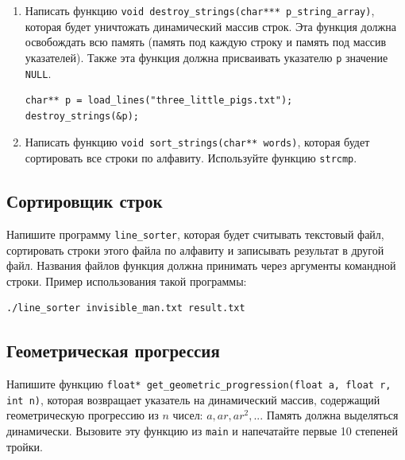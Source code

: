 \documentclass{article}
\begin{document}
\begin{enumerate}
\item Написать функцию \texttt{void destroy\_strings(char*** p\_string\_array)}, которая будет уничтожать динамический массив строк. Эта функция должна освобождать всю память (память под каждую строку и память под массив указателей). Также эта функция должна присваивать указателю \texttt{p} значение \texttt{NULL}.
\begin{lstlisting}
char** p = load_lines("three_little_pigs.txt");
destroy_strings(&p);
\end{lstlisting}

\item Написать функцию \texttt{void sort\_strings(char** words)}, которая будет сортировать все строки по алфавиту. Используйте функцию \texttt{strcmp}.
\end{enumerate}

\subsection{Сортировщик строк}
Напишите программу \texttt{line\_sorter}, которая будет считывать текстовый файл, сортировать строки этого файла по алфавиту и записывать результат в другой файл. Названия файлов функция должна принимать через аргументы командной строки.
Пример использования такой программы:

\begin{verbatim}
./line_sorter invisible_man.txt result.txt
\end{verbatim}


\subsection{Геометрическая прогрессия}
Напишите функцию \texttt{float* get\_geometric\_progression(float a, float r, int n)}, которая возвращает указатель на динамический массив, содержащий геометрическую прогрессию из $n$ чисел: 
$a, ar, ar^2, ...$ 
Память должна выделяться динамически. Вызовите эту функцию из \texttt{main} и напечатайте первые 10 степеней тройки.
\end{document}
